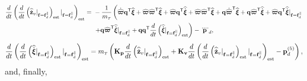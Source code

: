\documentclass[journal,onecolumn]{IEEEtran}
\begin{document}
	\begin{equation}
		\begin{aligned}
			\frac{d}{dt}\LP\frac{d}{dt}\LP\zvdothatdot|_{\f=\fd^{\|}}\RP_{\text{est}}|_{\f=\fd^{\|}}\RP_{\text{est}} =~& -\frac{1}{\mT}\left(\vphantom{\frac{d}{dt}\LP\widehat{\dot{\Xiq}}|_{\f=\fd^{\|}}\RP_{\text{est}}}\dot{\widehat{\bs{\varpi}}}\dir[T]\widehat{\Xiq}+\widehat{\bs{\varpi}}\widehat{\bs{\varpi}}\trs\widehat{\Xiq}+\widehat{\bs{\varpi}}\dir[T]\widehat{\dot{\Xiq}}+\widehat{\bs{\varpi}}\widehat{\bs{\varpi}}\trs\widehat{\Xiq}+\dir\dot{\widehat{\bs{\varpi}}}\trs\widehat{\Xiq}+\dir\widehat{\bs{\varpi}}\trs\widehat{\dot{\Xiq}}+\widehat{\bs{\varpi}}\dir[T]\widehat{\dot{\Xiq}}|_{\f=\fd^{\|}}\right.\nonumber\\
			&\left.+\dir\widehat{\bs{\varpi}}\trs\widehat{\dot{\Xiq}}|_{\f=\fd^{\|}}+\dir\dir[T]\frac{d}{dt}\LP\widehat{\dot{\Xiq}}|_{\f=\fd^{\|}}\RP_{\text{est}}\right)-\pLdqdot,
		\end{aligned}
	\end{equation}
	\begin{equation}
		\frac{d}{dt}\LP\frac{d}{dt}\LP\widehat{\dot{\Xiq}}|_{\f=\fd^{\|}}\RP_{\text{est}}|_{\f=\fd^{\|}}\RP_{\text{est}} = \mT\left(  {\bf K_p} \frac{d}{dt}\LP\zvdothatdot|_{\f=\fd^{\|}}\RP_{\text{est}}
		+  {\bf K_v} \frac{d}{dt}\LP\frac{d}{dt}\LP\zvdothatdot|_{\f=\fd^{\|}}\RP_{\text{est}}|_{\f=\fd^{\|}}\RP_{\text{est}}
		- \pLd^{(5)}\right),
	\end{equation}
	and, finally,
\end{document}
